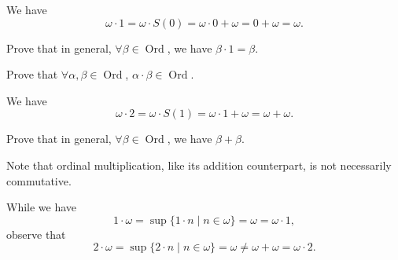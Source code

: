 \documentclass[notoc,notitlepage]{tufte-book}
\DeclareMathOperator{\Ord}{Ord }
\begin{document}
\begin{eg}
  We have
  \begin{equation*}
    \omega \cdot 1 = \omega \cdot S(0) = \omega \cdot 0 + \omega = 0 + \omega = \omega.
  \end{equation*}
\end{eg}

\begin{ex}
  Prove that in general, $\forall \beta \in \Ord$, we have $\beta \cdot 1 = \beta$.
\end{ex}

\begin{ex}
  Prove that $\forall \alpha, \beta \in \Ord$, $\alpha \cdot \beta \in \Ord$.
\end{ex}

\begin{eg}
  We have
  \begin{equation*}
    \omega \cdot 2 = \omega \cdot S(1) = \omega \cdot 1 + \omega = \omega + \omega.
  \end{equation*}
\end{eg}

\begin{ex}
  Prove that in general, $\forall \beta \in \Ord$, we have $\beta + \beta$.
\end{ex}

Note that ordinal multiplication, like its addition counterpart, is not necessarily commutative.

\begin{eg}
  While we have
  \begin{equation*}
    1 \cdot \omega = \sup \{ 1 \cdot n \mid n \in \omega \} = \omega = \omega \cdot 1,
  \end{equation*}
  observe that
  \begin{equation*}
    2 \cdot \omega = \sup \{ 2 \cdot n \mid n \in \omega \} = \omega \neq \omega + \omega = \omega \cdot 2.
  \end{equation*}
\end{eg}
\end{document}
